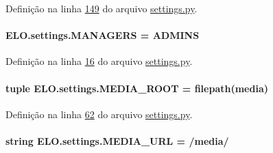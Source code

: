 Definição na linha \hyperlink{settings_8py_source_l00149}{149} do arquivo \hyperlink{settings_8py_source}{settings.\+py}.

\hypertarget{namespaceELO_1_1settings_a43e8826e0b24e337065b4975f3eace4c}{}
\paragraph[{M\+A\+N\+A\+G\+E\+R\+S}]{\setlength{\rightskip}{0pt plus 5cm}E\+L\+O.\+settings.\+M\+A\+N\+A\+G\+E\+R\+S = {\bf A\+D\+M\+I\+N\+S}}\label{namespaceELO_1_1settings_a43e8826e0b24e337065b4975f3eace4c}


Definição na linha \hyperlink{settings_8py_source_l00016}{16} do arquivo \hyperlink{settings_8py_source}{settings.\+py}.

\hypertarget{namespaceELO_1_1settings_a7f83b56101acea110bb525439aaa69aa}{}
\paragraph[{M\+E\+D\+I\+A\+\_\+\+R\+O\+O\+T}]{\setlength{\rightskip}{0pt plus 5cm}tuple E\+L\+O.\+settings.\+M\+E\+D\+I\+A\+\_\+\+R\+O\+O\+T = {\bf filepath}(\textquotesingle{}media\textquotesingle{})}\label{namespaceELO_1_1settings_a7f83b56101acea110bb525439aaa69aa}


Definição na linha \hyperlink{settings_8py_source_l00062}{62} do arquivo \hyperlink{settings_8py_source}{settings.\+py}.

\hypertarget{namespaceELO_1_1settings_acd3e1c3559f7c87f5aad004b76458ddc}{}
\paragraph[{M\+E\+D\+I\+A\+\_\+\+U\+R\+L}]{\setlength{\rightskip}{0pt plus 5cm}string E\+L\+O.\+settings.\+M\+E\+D\+I\+A\+\_\+\+U\+R\+L = \textquotesingle{}/media/\textquotesingle{}}\label{namespaceELO_1_1settings_acd3e1c3559f7c87f5aad004b76458ddc}


